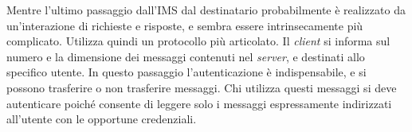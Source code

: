 \documentclass{article}
\numberwithin{equation}{subsection}
\begin{document}
Mentre l'ultimo passaggio dall'IMS dal destinatario probabilmente è realizzato da un'interazione di richieste e risposte, e sembra essere intrinsecamente più complicato. Utilizza quindi un protocollo più articolato. 
Il \textit{client} si informa sul numero e la dimensione dei messaggi contenuti nel \textit{server}, e destinati allo specifico utente. In questo passaggio l'autenticazione è indispensabile, e si possono trasferire o non trasferire messaggi. 
Chi utilizza questi messaggi si deve autenticare poiché consente di leggere solo i messaggi espressamente indirizzati all'utente con le opportune credenziali. 
\end{document}
